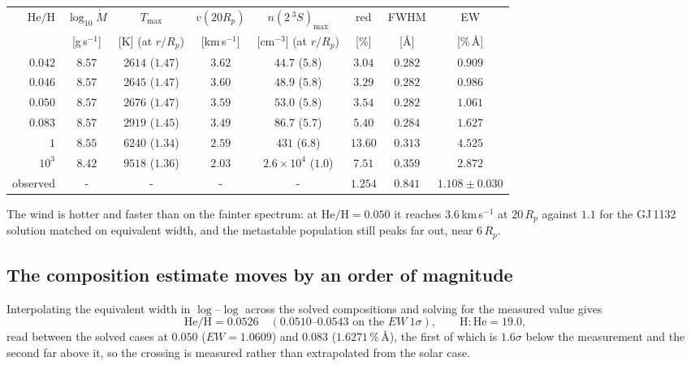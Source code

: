 \documentclass[english,a4paper]{my_memo}
\begin{document}
\begin{center}
\begin{tabular}{rccccccc}
\toprule
$\mathrm{He/H}$ & $\log_{10}\dot M$ & $T_{\max}$ & $v(20R_p)$
  & $n(2\,^3S)_{\max}$ & red & FWHM & EW \\
 & [g\,s$^{-1}$] & [K] (at $r/R_p$) & [km\,s$^{-1}$]
  & [cm$^{-3}$] (at $r/R_p$) & [\%] & [\AA] & [\%\,\AA] \\
\midrule
$0.042$  & $8.57$ & $2614$ ($1.47$) & $3.62$ & $44.7$ ($5.8$) & $3.04$ & $0.282$ & $0.909$ \\
$0.046$  & $8.57$ & $2645$ ($1.47$) & $3.60$ & $48.9$ ($5.8$) & $3.29$ & $0.282$ & $0.986$ \\
$0.050$  & $8.57$ & $2676$ ($1.47$) & $3.59$ & $53.0$ ($5.8$) & $3.54$ & $0.282$ & $1.061$ \\
$0.083$  & $8.57$ & $2919$ ($1.45$) & $3.49$ & $86.7$ ($5.7$) & $5.40$ & $0.284$ & $1.627$ \\
$1$      & $8.55$ & $6240$ ($1.34$) & $2.59$ & $431$  ($6.8$) & $13.60$ & $0.313$ & $4.525$ \\
$10^{3}$ & $8.42$ & $9518$ ($1.36$) & $2.03$ & $2.6\times10^{4}$ ($1.0$)
         & $7.51$  & $0.359$ & $2.872$ \\
\midrule
observed & - & - & - & - & $1.254$ & $0.841$ & $1.108 \pm 0.030$ \\
\bottomrule
\end{tabular}
\end{center}

The wind is hotter and faster than on the fainter spectrum: at
$\mathrm{He/H} = 0.050$ it reaches $3.6$\,km\,s$^{-1}$ at $20\,R_p$ against
$1.1$ for the GJ\,1132 solution matched on equivalent width, and the
metastable population still peaks far out, near $6\,R_p$.

\subsection{The composition estimate moves by an order of magnitude}

Interpolating the equivalent width in $\log$--$\log$ across the solved
compositions and solving for the measured value gives
\begin{equation}
  \mathrm{He/H} = 0.0526 \quad (0.0510\text{--}0.0543 \text{ on the } EW\
  1\sigma), \qquad \mathrm{H\!:\!He} = 19.0 ,
\end{equation}
read between the solved cases at $0.050$ ($EW = 1.0609$) and $0.083$
($1.6271$\,\%\,\AA), the first of which is $1.6\sigma$ below the measurement
and the second far above it, so the crossing is measured rather than
extrapolated from the solar case.
\end{document}
